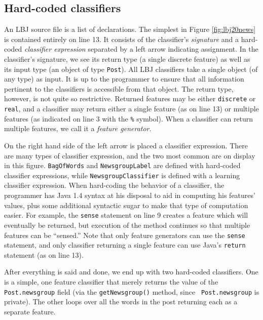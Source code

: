 \subsection{Hard-coded classifiers}

An LBJ source file is a list of declarations.  The simplest in Figure
\ref{fig:lbj20news} is contained entirely on line 13.  It consists of the
classifier's \emph{signature} and a hard-coded \emph{classifier expression}
separated by a left arrow indicating assignment.  In the classifier's
signature, we see its return type (a single discrete feature) as well as its
input type (an object of type {\tt Post}).  All LBJ classifiers take a single
object (of any type) as input.  It is up to the programmer to ensure that all
information pertinent to the classifiers is accessible from that object.  The
return type, however, is not quite so restrictive.  Returned features may be
either {\tt discrete} or {\tt real}, and a classifier may return either a
single feature (as on line 13) or multiple features (as indicated on line 3
with the {\tt \%} symbol).  When a classifier can return multiple features, we
call it a \emph{feature generator}.

On the right hand side of the left arrow is placed a classifier expression.
There are many types of classifier expression, and the two most common are on
display in this figure.  {\tt BagOfWords} and {\tt NewsgroupLabel} are defined
with hard-coded classifier expressions, while {\tt NewsgroupClassifier} is
defined with a learning classifier expression.  When hard-coding the behavior
of a classifier, the programmer has Java 1.4 syntax at his disposal to aid in
computing his features' values, plus some additional syntactic sugar to make
that type of computation easier.
%
%
For example, the {\tt sense} statement on line 9 creates a feature which will
eventually be returned, but execution of the method continues so that multiple
features can be ``sensed.''  Note that only feature generators can use the
{\tt sense} statement, and only classifier returning a single feature can use
Java's {\tt return} statement (as on line 13).

After everything is said and done, we end up with two hard-coded classifiers.
One is a simple, one feature classifier that merely returns the value of the
{\tt Post.newsgroup} field (via the {\tt getNewsgroup()} method, since {\tt
Post.newsgroup} is private).  The other loops over all the words in the post
returning each as a separate feature.

